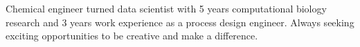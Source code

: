 

\begin{cvparagraph}


Chemical engineer turned data scientist with 5 years computational biology research and 3 years work experience as a process design engineer. Always seeking exciting opportunities to be creative and make a difference.

\vspace{-2.0mm}

\end{cvparagraph}
